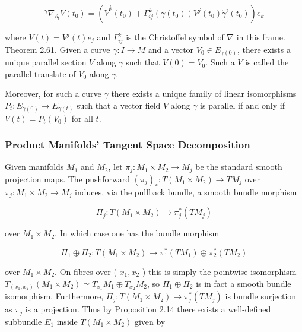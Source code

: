 \documentclass[10pt, letterpaper]{article}
\begin{document}
$$
{ }^{\gamma} \nabla_{\partial_{t}} V\left(t_{0}\right)=\left(\dot{V}^{k}\left(t_{0}\right)+\Gamma_{i j}^{k}\left(\gamma\left(t_{0}\right)\right) V^{j}\left(t_{0}\right) \dot{\gamma}^{i}\left(t_{0}\right)\right) e_{k}
$$

where $V(t)=V^{j}(t) e_{j}$ and $\Gamma_{i j}^{k}$ is the Christoffel symbol of $\nabla$ in this frame.\\
Theorem 2.61. Given a curve $\gamma: I \rightarrow M$ and a vector $V_{0} \in E_{\gamma(0)}$, there exists a unique parallel section $V$ along $\gamma$ such that $V(0)=V_{0}$. Such a $V$ is called the parallel translate of $V_{0}$ along $\gamma$.

Moreover, for such a curve $\gamma$ there exists a unique family of linear isomorphisms $P_{t}: E_{\gamma(0)} \rightarrow E_{\gamma(t)}$ such that a vector field $V$ along $\gamma$ is parallel if and only if $V(t)=P_{t}\left(V_{0}\right)$ for all $t$.

\subsubsection*{Product Manifolds' Tangent Space Decomposition}
Given manifolds $M_{1}$ and $M_{2}$, let $\pi_{j}: M_{1} \times M_{2} \rightarrow M_{j}$ be the standard smooth projection maps. The pushforward $\left(\pi_{j}\right)_{*}: T\left(M_{1} \times M_{2}\right) \rightarrow T M_{j}$ over $\pi_{j}: M_{1} \times M_{2} \rightarrow M_{j}$ induces, via the pullback bundle, a smooth bundle morphism

$$
\Pi_{j}: T\left(M_{1} \times M_{2}\right) \rightarrow \pi_{j}^{*}\left(T M_{j}\right)
$$

over $M_{1} \times M_{2}$. In which case one has the bundle morphism

$$
\Pi_{1} \oplus \Pi_{2}: T\left(M_{1} \times M_{2}\right) \rightarrow \pi_{1}^{*}\left(T M_{1}\right) \oplus \pi_{2}^{*}\left(T M_{2}\right)
$$

over $M_{1} \times M_{2}$. On fibres over ( $x_{1}, x_{2}$ ) this is simply the pointwise isomorphism $T_{\left(x_{1}, x_{2}\right)}\left(M_{1} \times M_{2}\right) \simeq T_{x_{1}} M_{1} \oplus T_{x_{2}} M_{2}$, so $\Pi_{1} \oplus \Pi_{2}$ is in fact a smooth bundle isomorphism. Furthermore, $\Pi_{j}: T\left(M_{1} \times M_{2}\right) \rightarrow \pi_{j}^{*}\left(T M_{j}\right)$ is bundle surjection as $\pi_{j}$ is a projection. Thus by Proposition 2.14 there exists a well-defined subbundle $E_{1}$ inside $T\left(M_{1} \times M_{2}\right)$ given by
\end{document}
